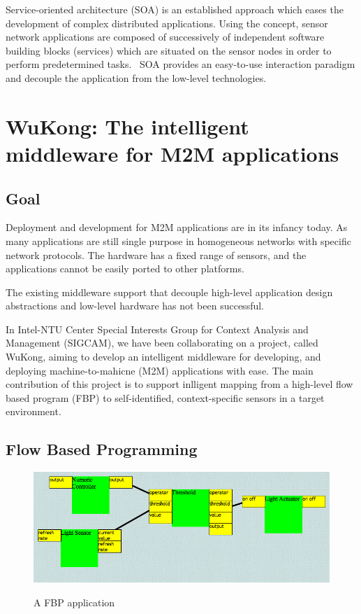 Service-oriented architecture (SOA) is an established approach which eases the
development of complex distributed applications. Using the concept, sensor
network applications are composed of successively of independent software
building blocks (services) which are situated on the sensor nodes in order to
perform predetermined tasks.~\cite{Neumann2010, Marin-Perianu2007} SOA provides
an easy-to-use interaction paradigm and decouple the application from the
low-level technologies.

\section{WuKong: The intelligent middleware for M2M applications}

\subsection{Goal}

Deployment and development for M2M applications are in its infancy today. As
many applications are still single purpose in homogeneous networks with
specific network protocols. The hardware has a fixed range of sensors, and the
applications cannot be easily ported to other platforms.

The existing middleware support that decouple high-level application design
abstractions and low-level hardware has not been successful.

In Intel-NTU Center Special Interests Group for Context Analysis and Management 
(SIGCAM), we have been collaborating on a project, called WuKong, aiming to develop 
an intelligent middleware for developing, and deploying machine-to-mahicne 
(M2M) applications with ease. The main contribution of this project is to support
inlligent mapping from a high-level flow based program (FBP) to
self-identified, context-specific sensors in a target
environment\cite{Reijers}.

\subsection{Flow Based Programming}

\begin{figure}[h!]
\caption{A FBP application}
\centering
    \includegraphics[width=\linewidth]{figures/fbp-application}
\label{fig:fbp-application}
\end{figure}

